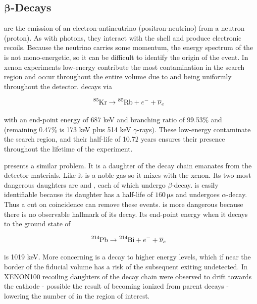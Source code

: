 \subsection[$\beta$-Decays][$\beta$-Decays]{$\mathbf{\beta}$-Decays}
\label{subsec:beta}
\betadecays are the emission of an electron-antineutrino (positron-neutrino) from a neutron (proton).  As with photons, they interact
with the \electron shell and produce electronic recoils.  Because the neutrino carries
some momentum, the energy spectrum of the \electron is not mono-energetic, so it can be difficult to identify the origin of the event.  In
xenon
experiments low-energy \betadecays contribute the most contamination in the search region and occur throughout the entire volume due to
 and  being uniformly throughout the detector.  \krypton decays via

\begin{equation}
\ce{^{85}Kr} \rightarrow \ce{^{85}Rb} + e^{-} + \overline{\nu}_e
\end{equation}

\noindent with an end-point energy of 687 keV and branching ratio of 99.53\% and (remaining 0.47\% is 173 keV plus 514 keV
$\gamma$-rays).  These low-energy \betadecays
contaminate the search region, and their half-life of 10.72 years ensures their presence throughout the lifetime of the experiment.

 presents a similar problem.  It is a daughter of the  decay chain emanates from the detector materials.  Like
 it is a noble gas so it mixes with the xenon.  Its two most dangerous daughters are \leadtwofourteen and , each
of which
undergo $\beta$-decay.   is easily identifiable because its daughter \poloniumtwofourteen has a half-life of
$160\ \mathrm{\mu s}$ and undergoes $\alpha$-decay.  Thus a cut on coincidence can remove these events.  \leadtwofourteen is more
dangerous because there is no observable hallmark of its decay.  Its end-point energy when it decays to the ground state of
\bismuthtwofourteen

\begin{equation}
\ce{^{214}Pb} \rightarrow \ce{^{214}Bi} + e^{-} + \overline{\nu}_e
\end{equation}

\noindent is 1019 keV.  More concerning is a decay to higher energy levels, which
if near the border of the fiducial volume has a risk of the subsequent \gammaray exiting undetected.  In XENON100 recoiling daughters of
the  decay chain were observed to drift towards the cathode - possible the result of becoming ionized from parent decays
 - lowering the number of \betadecays in the region of interest.


